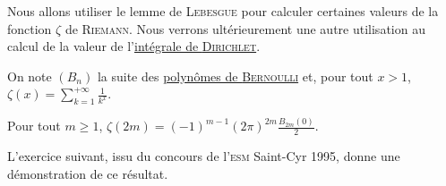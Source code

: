 %
%


\bigskip



Nous allons utiliser le lemme de \textsc{Lebesgue} pour calculer certaines valeurs de la fonction $\zeta$ de \textsc{Riemann}. Nous verrons ultérieurement une autre utilisation au calcul de la valeur de l'\hyperref[sec:intDirichlet]{intégrale de \textsc{Dirichlet}}.





On note $(B_n)$ la suite des \hyperref[sec:polynomes_de_bernoulli]{polynômes de \textsc{Bernoulli}} et, pour tout $x > 1$, $\zeta(x) = \sum\limits_{k=1}^{+\infty} \frac{1}{k^x}$.

\begin{theo}
Pour tout $m \geq 1$, $\zeta(2m) = (-1)^{m-1} (2 \pi)^{2m} \frac{B_{2m}(0)}{2}$.
\end{theo}

L'exercice suivant, issu du concours de l'\textsc{esm} Saint-Cyr 1995, donne une démonstration de ce résultat. 

